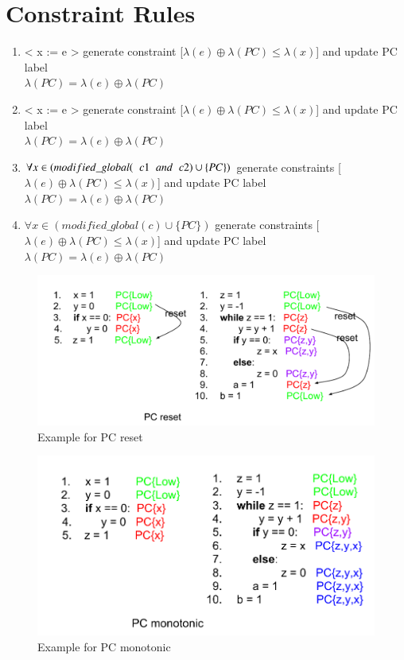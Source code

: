\section{Constraint Rules}
\begin{enumerate}
	\item < x := e > generate constraint [$\lambda(e)\oplus\lambda(PC)\le\lambda(x)$] and update PC label\\ $\lambda(PC) = \lambda(e)\oplus\lambda(PC)$ 
	\item < x := e > generate constraint [$\lambda(e)\oplus\lambda(PC)\le\lambda(x)$] and update PC label\\ $\lambda(PC) = \lambda(e)\oplus\lambda(PC)$ 
	\item < if e then c1 else c2>  $\forall  x \in ( modified\_global(\hspace{0.2cm} c1 \hspace{0.2cm}and \hspace{0.2cm} c2) \cup \{PC\} )$ generate constraints [$\lambda(e)\oplus\lambda(PC)\le\lambda(x)$] and update PC label $\lambda(PC) = \lambda(e)\oplus\lambda(PC)$
	
	\item < while e do c > $\forall  x \in ( modified\_global(c) \cup \{PC\} )$ generate constraints [$\lambda(e)\oplus\lambda(PC)\le\lambda(x)$] and update PC label $\lambda(PC) = \lambda(e)\oplus\lambda(PC)$
\end{enumerate}

\begin{figure}
	\includegraphics[width=1\textwidth]{PC_reset.pdf}
	\centering
	\caption{Example for PC reset}
	\label{fig:pcreset}
\end{figure}
\begin{figure}
	\includegraphics[width=1\textwidth]{PC_monotonic.pdf}
	\centering
	\caption{Example for PC monotonic}
	\label{fig:pcreset}
\end{figure}
